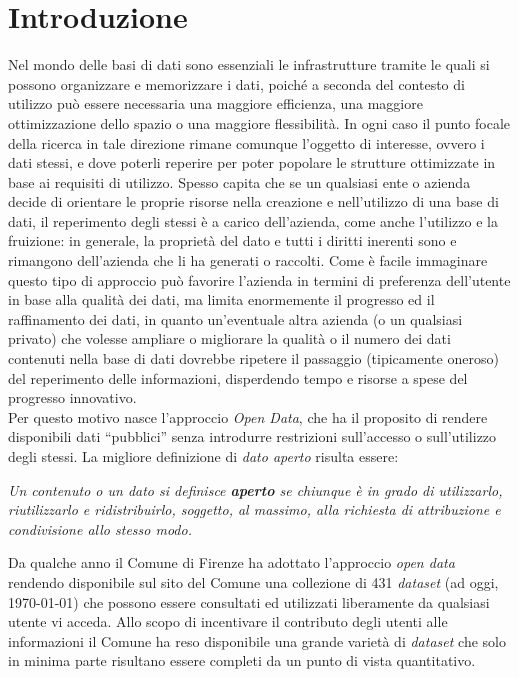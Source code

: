\chapter*{Introduzione}
	
	Nel mondo delle basi di dati sono essenziali le infrastrutture tramite le quali si possono organizzare e memorizzare i dati, poiché a seconda del contesto di utilizzo può essere necessaria una maggiore efficienza, una maggiore ottimizzazione dello spazio o una maggiore flessibilità. In ogni caso il punto focale della ricerca in tale direzione rimane comunque l'oggetto di interesse, ovvero i dati stessi, e dove poterli reperire per poter popolare le strutture ottimizzate in base ai requisiti di utilizzo. Spesso capita che se un qualsiasi ente o azienda decide di orientare le proprie risorse nella creazione e nell'utilizzo di una base di dati, il reperimento degli stessi è a carico dell'azienda, come anche l'utilizzo e la fruizione: in generale, la proprietà del dato e tutti i diritti inerenti sono e rimangono dell'azienda che li ha generati o raccolti. Come è facile immaginare questo tipo di approccio può favorire l'azienda in termini di preferenza dell'utente in base alla qualità dei dati, ma limita enormemente il progresso ed il raffinamento dei dati, in quanto un'eventuale altra azienda (o un qualsiasi privato) che volesse ampliare o migliorare la qualità o il numero dei dati contenuti nella base di dati dovrebbe ripetere il passaggio (tipicamente oneroso) del reperimento delle informazioni, disperdendo tempo e risorse a spese del progresso innovativo.\\
	Per questo motivo nasce l'approccio \textit{Open Data}, che ha il proposito di rendere disponibili dati ``pubblici'' senza introdurre restrizioni sull'accesso o sull'utilizzo degli stessi. La migliore definizione di \textit{dato aperto} risulta essere:\\
	\begin{center}
		\textit{Un contenuto o un dato si definisce \textbf{aperto} se chiunque è in grado di utilizzarlo, riutilizzarlo e ridistribuirlo, soggetto, al massimo, alla richiesta di attribuzione e condivisione allo stesso modo.}
	\end{center}
	\vspace{0.5cm}
	Da qualche anno il Comune di Firenze ha adottato l'approccio \textit{open data} rendendo disponibile sul sito del Comune una collezione di 431 \textit{dataset} (ad oggi, \today) che possono essere consultati ed utilizzati liberamente da qualsiasi utente vi acceda. Allo scopo di incentivare il contributo degli utenti alle informazioni il Comune ha reso disponibile una grande varietà di \textit{dataset} che solo in minima parte risultano essere completi da un punto di vista quantitativo.\\
